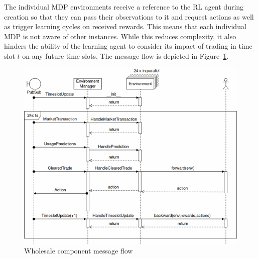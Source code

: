 The individual \ac{MDP} environments receive a reference to the \ac{RL} agent during creation so that they can pass
their observations to it and request actions as well as trigger learning cycles on received rewards. This means that
each individual \ac{MDP} is not aware of other instances. While this reduces complexity, it also hinders the ability of
the learning agent to consider its impact of trading in time slot $t$ on any future time slots. The message flow is
depicted in Figure~\ref{fig:ws_msg_flow}.



\begin{figure}[h]
    \centering
    \includegraphics[width=1.0\linewidth]{img/WholesaleComponent.png}
    \caption{Wholesale component message flow}
    \label{fig:ws_msg_flow}
\end{figure}

